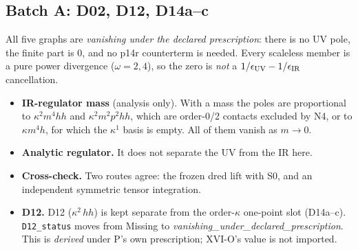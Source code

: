 \subsection{Batch A: D02, D12, D14a--c}
All five graphs are \emph{vanishing under the declared prescription}: there is no UV pole, the finite part is $0$, and
no p14r counterterm is needed. Every scaleless member is a pure power divergence ($\omega=2,4$), so the zero is
\emph{not} a $1/\epsilon_{\rm UV}-1/\epsilon_{\rm IR}$ cancellation.
\begin{itemize}
\item \textbf{IR-regulator mass} (analysis only). With a mass the poles are proportional to $\kappa^2m^4hh$ and
$\kappa^2m^2p^2hh$, which are order-0/2 contacts excluded by N4, or to $\kappa m^4h$, for which the $\kappa^1$ basis is
empty. All of them vanish as $m\to0$.
\item \textbf{Analytic regulator.} It does not separate the UV from the IR here.
\item \textbf{Cross-check.} Two routes agree: the frozen dred lift with S0, and an independent symmetric tensor
integration.
\item \textbf{D12.} D12 ($\kappa^2\,hh$) is kept separate from the order-$\kappa$ one-point slot (D14a--c).
\texttt{D12\_status} moves from Missing to \emph{vanishing\_under\_declared\_prescription}. This is \emph{derived} under
P's own prescription; XVI-O's value is not imported.
\end{itemize}

